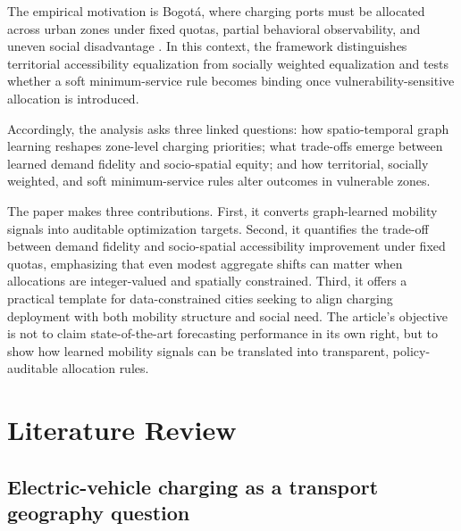 \documentclass[final,5p,times,twocolumn,authoryear]{elsarticle}
\begin{document}
The empirical motivation is Bogot\'a, where charging ports must be allocated across urban
zones under fixed quotas, partial behavioral observability, and uneven social disadvantage
\citep{SDM2025}. In this context, the framework distinguishes territorial accessibility
equalization from socially weighted equalization and tests whether a soft minimum-service
rule becomes binding once vulnerability-sensitive allocation is introduced.

Accordingly, the analysis asks three linked questions: how spatio-temporal graph learning
reshapes zone-level charging priorities; what trade-offs emerge between learned demand
fidelity and socio-spatial equity; and how territorial, socially weighted, and soft
minimum-service rules alter outcomes in vulnerable zones.

The paper makes three contributions. First, it converts graph-learned mobility signals into
auditable optimization targets. Second, it quantifies the trade-off between demand fidelity
and socio-spatial accessibility improvement under fixed quotas, emphasizing that even modest
aggregate shifts can matter when allocations are integer-valued and spatially constrained.
Third, it offers a practical template for data-constrained cities seeking to align charging
deployment with both mobility structure and social need. The article's objective is not to
claim state-of-the-art forecasting performance in its own right, but to show how learned
mobility signals can be translated into transparent, policy-auditable allocation rules.

\section{Literature Review}

\subsection{Electric-vehicle charging as a transport geography question}
\end{document}
